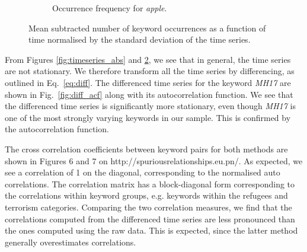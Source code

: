 \documentclass[12pt, a4paper]{article}
\begin{document}
\begin{figure}
\begin{subfigure}{.5\textwidth}
  \caption{Occurrence frequency for \textit{apple}.}
  \label{fig:sub23}
\end{subfigure}
\caption{Mean subtracted number of keyword occurrences as a function of time normalised by the standard deviation of the time series.}
\label{fig:timeseries_rel}
\end{figure}

From Figures \ref{fig:timeseries_abs} and \ref{fig:timeseries_rel}, we see that in general, the time series are not stationary. We therefore transform all the time series by differencing, as outlined in Eq.~\ref{eq:diff}. The differenced time series for the keyword \textit{MH17} are shown in Fig.~\ref{fig:diff_acf} along with its autocorrelation function. We see that the differenced time series is significantly more stationary, even though \textit{MH17} is one of the most strongly varying keywords in our sample. This is confirmed by the autocorrelation function.

The cross correlation coefficients between keyword pairs for both methods are shown in Figures 6 and 7 on http://spuriousrelationships.eu.pn/. As expected, we see a correlation of 1 on the diagonal, corresponding to the normalised auto correlations. The correlation matrix has a block-diagonal form corresponding to the correlations within keyword groups, e.g. keywords within the refugees and terrorism categories. Comparing the two correlation measures, we find that the correlations computed from the differenced time series are less pronounced than the ones computed using the raw data. This is expected, since the latter method generally overestimates correlations. 
\end{document}
